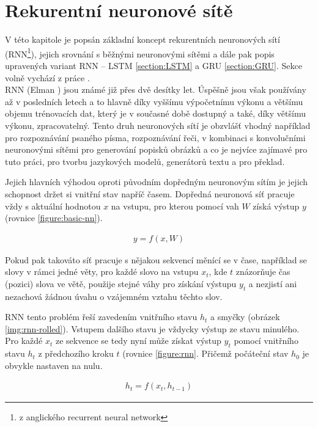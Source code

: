 \section{Rekurentní neuronové sítě}\label{section:rnn}
V této kapitole je popsán základní koncept rekurentních neuronových sítí (RNN\footnote{z anglického recurrent neural network}), jejich srovnání s běžnými neuronovými sítěmi a dále pak popis upravených variant RNN -- LSTM \ref{section:LSTM} a GRU \ref{section:GRU}. Sekce volně vychází z práce \cite{nmtThesis}.\\


RNN (Elman \cite{rnn}) jsou známé již přes dvě desítky let. Úspěšně jsou však používány až v posledních letech a to hlavně díky vyššímu výpočetnímu výkonu a většímu objemu trénovacích dat, který je v současné době dostupný a také, díky většímu výkonu, zpracovatelný. Tento druh neuronových sítí je obzvlášť vhodný například pro rozpoznávání psaného písma, rozpoznávání řeči, v kombinaci s konvolučními neuronovými sítěmi pro generování popisků obrázků a co je nejvíce zajímavé pro tuto práci, pro tvorbu jazykových modelů, generátorů textu a pro překlad.

Jejich hlavních výhodou oproti původním dopředným neuronovým sítím je jejich schopnost držet si vnitřní stav napříč časem. Dopředná neuronová síť pracuje vždy s aktuální hodnotou $x$ na vstupu, pro kterou pomocí vah $W$ získá výstup $y$ (rovnice \ref{figure:basic-nn}).

\begin{align}\label{figure:basic-nn}
  y = f (x, W)
\end{align}

Pokud pak takováto síť pracuje s nějakou sekvencí měnící se v čase, například se slovy v rámci jedné věty, pro každé slovo na vstupu $x_t$, kde $t$ znázorňuje čas (pozici) slova ve větě, použije stejné váhy pro získání výstupu $y_t$ a nezjistí ani nezachová žádnou úvahu o vzájemném vztahu těchto slov.

RNN tento problém řeší zavedením vnitřního stavu $h_t$ a smyčky (obrázek \ref{img:rnn-rolled}). Vstupem dalšího stavu je vždycky výstup ze stavu minulého. Pro každé $x_t$ ze sekvence se tedy nyní může získat výstup $y_t$ pomocí vnitřního stavu $h_t$ z předchozího kroku $t$ (rovnice \ref{figure:rnn}. Přičemž počáteční stav  $h_0$ je obvykle nastaven na nulu.

\begin{align}\label{figure:rnn}
  h_t = f (x_t, h_{t-1})
\end{align}

